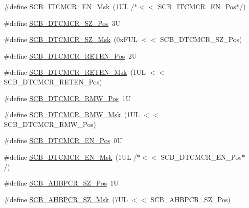 \begin{DoxyCompactItemize}
\#define \mbox{\hyperlink{group___c_m_s_i_s___s_c_b_ga4d1c57f26a03910ab0549efecd2a602c}{S\+C\+B\+\_\+\+I\+T\+C\+M\+C\+R\+\_\+\+E\+N\+\_\+\+Msk}}~(1\+U\+L /$\ast$$<$$<$ S\+C\+B\+\_\+\+I\+T\+C\+M\+C\+R\+\_\+\+E\+N\+\_\+\+Pos$\ast$/)
\item 
\#define \mbox{\hyperlink{group___c_m_s_i_s___s_c_b_ga3cacd7498eb3c022ecc7e21a3dfc3c13}{S\+C\+B\+\_\+\+D\+T\+C\+M\+C\+R\+\_\+\+S\+Z\+\_\+\+Pos}}~3U
\item 
\#define \mbox{\hyperlink{group___c_m_s_i_s___s_c_b_ga35b381dd367cd1533f5c2b2c88720b72}{S\+C\+B\+\_\+\+D\+T\+C\+M\+C\+R\+\_\+\+S\+Z\+\_\+\+Msk}}~(0x\+F\+U\+L $<$$<$ S\+C\+B\+\_\+\+D\+T\+C\+M\+C\+R\+\_\+\+S\+Z\+\_\+\+Pos)
\item 
\#define \mbox{\hyperlink{group___c_m_s_i_s___s_c_b_ga8b72fb208ee772734e580911a8e522ce}{S\+C\+B\+\_\+\+D\+T\+C\+M\+C\+R\+\_\+\+R\+E\+T\+E\+N\+\_\+\+Pos}}~2U
\item 
\#define \mbox{\hyperlink{group___c_m_s_i_s___s_c_b_gaa69bbf5b17808383d88f23a424c1b62e}{S\+C\+B\+\_\+\+D\+T\+C\+M\+C\+R\+\_\+\+R\+E\+T\+E\+N\+\_\+\+Msk}}~(1\+U\+L $<$$<$ S\+C\+B\+\_\+\+D\+T\+C\+M\+C\+R\+\_\+\+R\+E\+T\+E\+N\+\_\+\+Pos)
\item 
\#define \mbox{\hyperlink{group___c_m_s_i_s___s_c_b_ga11c115ca21511be7e56e997a8bde567a}{S\+C\+B\+\_\+\+D\+T\+C\+M\+C\+R\+\_\+\+R\+M\+W\+\_\+\+Pos}}~1U
\item 
\#define \mbox{\hyperlink{group___c_m_s_i_s___s_c_b_ga79b099c3a4365b434aaf55ebbd534420}{S\+C\+B\+\_\+\+D\+T\+C\+M\+C\+R\+\_\+\+R\+M\+W\+\_\+\+Msk}}~(1\+U\+L $<$$<$ S\+C\+B\+\_\+\+D\+T\+C\+M\+C\+R\+\_\+\+R\+M\+W\+\_\+\+Pos)
\item 
\#define \mbox{\hyperlink{group___c_m_s_i_s___s_c_b_gaf3ba6873b9288121146a6432db53540f}{S\+C\+B\+\_\+\+D\+T\+C\+M\+C\+R\+\_\+\+E\+N\+\_\+\+Pos}}~0U
\item 
\#define \mbox{\hyperlink{group___c_m_s_i_s___s_c_b_gafd9689d338f30fa434c7629083f29608}{S\+C\+B\+\_\+\+D\+T\+C\+M\+C\+R\+\_\+\+E\+N\+\_\+\+Msk}}~(1\+U\+L /$\ast$$<$$<$ S\+C\+B\+\_\+\+D\+T\+C\+M\+C\+R\+\_\+\+E\+N\+\_\+\+Pos$\ast$/)
\item 
\#define \mbox{\hyperlink{group___c_m_s_i_s___s_c_b_ga0f5d024d0d233713c33c5ba1a936d8d2}{S\+C\+B\+\_\+\+A\+H\+B\+P\+C\+R\+\_\+\+S\+Z\+\_\+\+Pos}}~1U
\item 
\#define \mbox{\hyperlink{group___c_m_s_i_s___s_c_b_ga9a22251ee32265508a9aa7bcff3e317a}{S\+C\+B\+\_\+\+A\+H\+B\+P\+C\+R\+\_\+\+S\+Z\+\_\+\+Msk}}~(7\+U\+L $<$$<$ S\+C\+B\+\_\+\+A\+H\+B\+P\+C\+R\+\_\+\+S\+Z\+\_\+\+Pos)
\item 

\end{DoxyCompactItemize}
